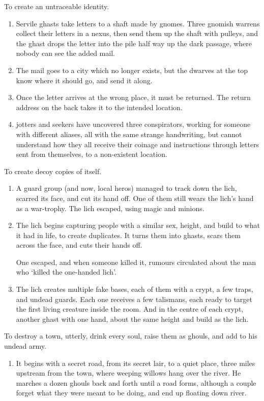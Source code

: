 \begin{multicols}{2}
\begin{dlist}
  \item
  To create an untraceable identity.
  \begin{enumerate}
    \item
    Servile ghasts take letters to a shaft made by gnomes.
    Three gnomish warrens collect their letters in a nexus, then send them up the shaft with pulleys, and the ghast drops the letter into the pile half way up the dark passage, where nobody can see the added mail.
    \item
    The mail goes to a city which no longer exists, but the dwarves at the top know where it should go, and send it along.
    \item
    Once the letter arrives at the wrong place, it must be returned.
    The return address on the back takes it to the intended location.
    \item
    \Glspl{jotter} and \glspl{seeker} have uncovered three conspirators, working for someone with different aliases, all with the same strange handwriting, but cannot understand how they all receive their coinage and instructions through letters sent from themselves, to a non-existent location.
  \end{enumerate}
  \item
  To create decoy copies of itself.
  \begin{enumerate}
    \item
    A \gls{guard} group (and now, local heros) managed to track down the \gls{lich}, scarred its face, and cut its hand off.
    One of them still wears the \gls{lich}'s hand as a war-trophy.
    The \gls{lich} escaped, using magic and minions.
    \item
    The \gls{lich} begins capturing people with a similar sex, height, and build to what it had in life, to create duplicates.
    It turns them into ghasts, scars them across the face, and cuts their hands off.

    One escaped, and when someone killed it, rumours circulated about the man who `killed the one-handed \gls{lich}'.
    \item
    The \gls{lich} creates multiple fake bases, each of them with a crypt, a few traps, and undead guards.
    Each one receives a few \glspl{talisman}, each ready to target the first living creature inside the room.
    And in the centre of each crypt, another ghast with one hand, about the same height and build as the \gls{lich}.
  \end{enumerate}
  \item
  To destroy a town, utterly, drink every soul, raise them as ghouls, and add to his undead army.
  \begin{enumerate}
    \item
    It begins with a secret road, from its secret lair, to a quiet place, three miles upstream from the town, where weeping willows hang over the river.
    He marches a dozen ghouls back and forth until a road forms, although a couple forget what they were meant to be doing, and end up floating down river.


\end{enumerate}
\end{dlist}
\end{multicols}
